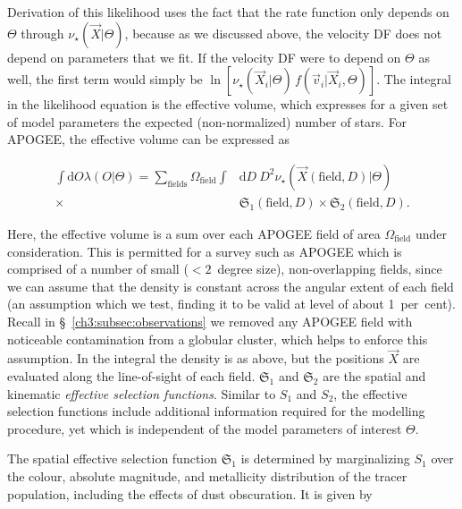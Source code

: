 \noindent Derivation of this likelihood uses the fact that the rate function only depends on $\Theta$ through $\nu_{\star}(\vec{X} \vert \Theta)$, because as we discussed above, the velocity DF does not depend on parameters that we fit. If the velocity DF were to depend on $\Theta$ as well, the first term would simply be $\ln [\nu_{\star}(\vec{X}_{i} \vert \Theta)\,f(\vec{v}_{i} \vert \vec{X}_i,\Theta)]$. The integral in the likelihood equation is the effective volume, which expresses for a given set of model parameters the expected (non-normalized) number of stars. For APOGEE, the effective volume can be expressed as 

\begin{equation}
\label{ch3:eq:effective-volume}
\begin{split}
	\int \mathrm{d}O \lambda(O \vert \Theta) = \sum_\mathrm{fields} \Omega_\mathrm{field} \int & \mathrm{d}D\ D^{2} \nu_{\star} (\vec{X}(\mathrm{field},D) \vert \Theta) \\
	\times & \mathfrak{S}_{1}(\mathrm{field},D) \times \mathfrak{S}_{2}(\mathrm{field},D).
\end{split}
\end{equation}

\noindent Here, the effective volume is a sum over each APOGEE field of area $\Omega_\mathrm{field}$ under consideration. This is permitted for a survey such as APOGEE which is comprised of a number of small ($< 2$~degree size), non-overlapping fields, since we can assume that the density is constant across the angular extent of each field (an assumption which we test, finding it to be valid at level of about 1~per~cent). Recall in \S~\ref{ch3:subsec:observations} we removed any APOGEE field with noticeable contamination from a globular cluster, which helps to enforce this assumption. In the integral the density is as above, but the positions $\vec{X}$ are evaluated along the line-of-sight of each field. $\mathfrak{S}_{1}$ and $\mathfrak{S}_{2}$ are the spatial and kinematic \textit{effective selection functions}. Similar to $S_{1}$ and $S_{2}$, the effective selection functions include additional information required for the modelling procedure, yet which is independent of the model parameters of interest $\Theta$. 

The spatial effective selection function $\mathfrak{S}_{1}$ is determined by marginalizing $S_{1}$ over the colour, absolute magnitude, and metallicity distribution of the tracer population, including the effects of dust obscuration. It is given by

